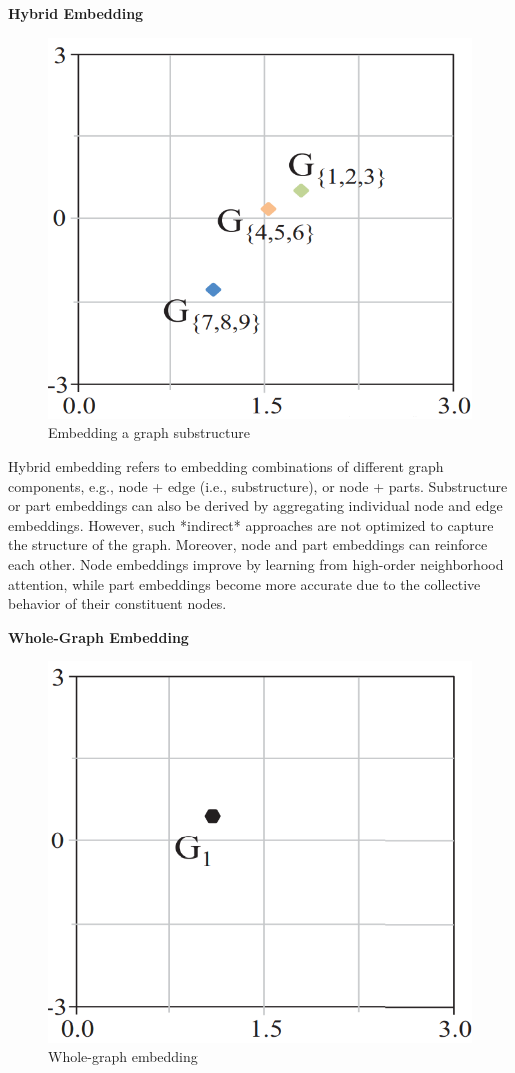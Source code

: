 \textbf{Hybrid Embedding}

\begin{figure}[htp]
	\centering
	\includegraphics[width=6 cm]{images/graph_emb_4.png}
	\caption{Embedding a graph substructure}
	\label{fig:substructureEmbedding}
\end{figure}

Hybrid embedding refers to embedding combinations of different graph components, e.g., node + edge (i.e., substructure), or node + parts. Substructure or part embeddings can also be derived by aggregating individual node and edge embeddings. However, such *indirect* approaches are not optimized to capture the structure of the graph. Moreover, node and part embeddings can reinforce each other. Node embeddings improve by learning from high-order neighborhood attention, while part embeddings become more accurate due to the collective behavior of their constituent nodes.

\textbf{Whole-Graph Embedding}

\begin{figure}[htp]
	\centering
	\includegraphics[width=6 cm]{images/graph_emb_5.png}
	\caption{Whole-graph embedding}
	\label{fig:wholeGraphEmbedding}
\end{figure}

